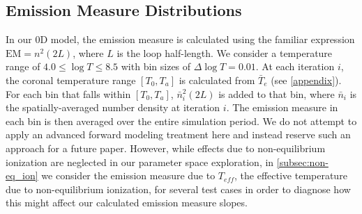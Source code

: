 \documentclass[apj]{emulateapj}
\begin{document}
	\subsection{Emission Measure Distributions}
	\label{subsec:em_dist}
	\par In our 0D model, the emission measure is calculated using the familiar expression $\mathrm{EM}=n^2(2L)$, where $L$ is the loop half-length. We consider a temperature range of $4.0\le\log{T}\le8.5$ with bin sizes of $\Delta\log{T}=0.01$. At each iteration $i$, the coronal temperature range $[T_0,T_a]$ is calculated from $\bar{T}_e$ (see \autoref{appendix}). For each bin that falls within $[T_0,T_a]$, $\bar{n}_i^2(2L)$ is added to that bin, where $\bar{n}_i$ is the spatially-averaged number density at iteration $i$. The emission measure in each bin is then averaged over the entire simulation period. We do not attempt to apply an advanced forward modeling treatment here and instead reserve such an approach for a future paper. However, while effects due to non-equilibrium ionization are neglected in our parameter space exploration, in \autoref{subsec:non-eq_ion} we consider the emission measure due to $T_{eff}$, the effective temperature due to non-equilibrium ionization, for several test cases in order to diagnose how this might affect our calculated emission measure slopes.
\end{document}

